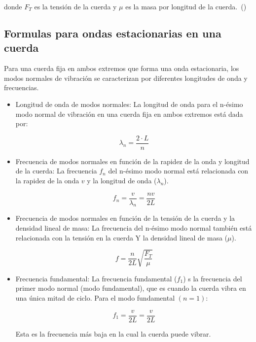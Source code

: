 \documentclass[twocolumn, 12pt]{article}
\begin{document}
donde $F_T$ es la tensión de la cuerda y $\mu$ es la masa
por longitud de la cuerda.~(\cite{Moebs_2021})

\subsection{Formulas para ondas estacionarias en una cuerda}

Para una cuerda fija en ambos extremos que forma una onda
estacionaria, los modos normales de vibración se
caracterizan por diferentes longitudes de onda y
frecuencias.

\begin{itemize}[label=$\triangleright$]
    \item Longitud de onda de modos normales: La longitud de onda
          para el n-ésimo modo normal de vibración en una cuerda fija
          en ambos extremos está dada por:

          \begin{equation}
              \lambda_{n} = \frac{2 \cdot L}{n}
              \label{eq:n_lambda}
          \end{equation}

    \item Frecuencia de modos normales en función de la rapidez de la
          onda y longitud de la cuerda: La frecuencia $f_n$ del
          n-ésimo modo normal está relacionada con la rapidez de la
          onda $v$ y la longitud de onda ($\lambda_{n}$).

          \begin{equation*}
              f_n = \frac{v}{\lambda_{n}} = \frac{n v}{2L}
          \end{equation*}

    \item Frecuencia de modos normales en función de la tensión de la
          cuerda y la densidad lineal de masa: La frecuencia del
          n-ésimo modo normal también está relacionada con la tensión
          en la cuerda Y la densidad lineal de masa ($\mu$).

          \begin{equation}
              f = \frac{n}{2 L} \sqrt{\frac{F_T}{\mu}}
              \label{eq:n_frecuencia}
          \end{equation}

    \item Frecuencia fundamental: La frecuencia fundamental ($f_{1}$)
          s la frecuencia del primer modo normal (modo fundamental),
          que es cuando la cuerda vibra en una única mitad de ciclo.
          Para el modo fundamental $(n=1)$:

          \begin{equation*}
              f_{1} = \frac{v}{2L} = \frac{v}{2L}
          \end{equation*}

          Esta es la frecuencia más baja en la cual la cuerda puede
          vibrar.
\end{itemize}
\end{document}
